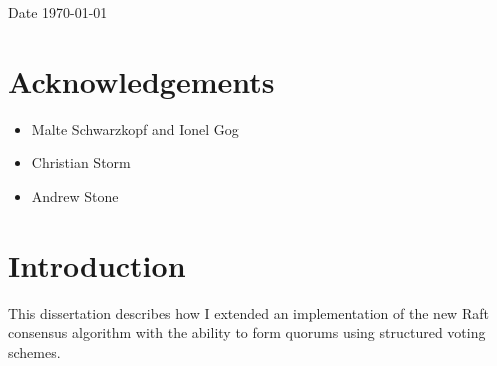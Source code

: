 \documentclass[12pt,chapterprefix=true,toc=bibliography,numbers=noendperiod,
               footnotes=multiple,twoside]{scrreprt}
\begin{document}
\vspace{0.2in}
Date \hspace{0.4in} \today



\chapter*{Acknowledgements}
\label{ch:acknowledgements}

\begin{itemize}
    \item Malte Schwarzkopf and Ionel Gog
    \item Christian Storm
    \item Andrew Stone
\end{itemize}

\tableofcontents





\chapter{Introduction}
\label{ch:introduction}


This dissertation describes how I extended an implementation of the new Raft consensus algorithm with the ability to form quorums using structured voting schemes.


\end{document}
